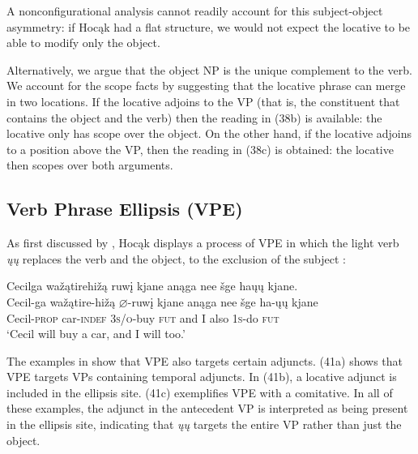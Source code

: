\documentclass[output=paper]{LSP/langsci}
\begin{document}
A nonconfigurational analysis cannot readily account for this subject-object asymmetry: if Hocąk had a flat structure, we would not expect the locative to be able to modify only the object.
	
Alternatively, we argue that the object NP is the unique complement to the verb. We account for the scope facts by suggesting that the locative phrase can merge in two locations. If the locative adjoins to the VP (that is, the constituent that contains the object and the verb) then the reading in (38b) is available: the locative only has scope over the object. On the other hand, if the locative adjoins to a position above the VP, then the reading in (38c) is obtained: the locative then scopes over both arguments.

\subsection{Verb Phrase Ellipsis (VPE)}

As first discussed by \citet{Johnson2013}, Hocąk displays a process of VPE in which the light verb \textit{\k{u}\k{u}} replaces the verb and the object, to the exclusion of the subject :

\begin{exe}
\ex\label{ex:jrs:40} 
\glll Cecilga	wa\v{z}ątirehi\v{z}ą		ruw\k{i}	kjane		anąga	nee		\v{s}ge		ha\k{u}\k{u}			kjane.\\
Cecil-ga	wa\v{z}ątire-hi\v{z}ą	$\varnothing$-ruw\k{i}		kjane		anąga	nee	\v{s}ge ha-\k{u}\k{u}		kjane \\
Cecil-\textsc{prop}		car-\textsc{indef}			\textsc{3s/o}-buy		\textsc{fut}	and	I	also	\textsc{1s}-do	\textsc{fut} \\
\trans `Cecil will buy a car, and I will too.'
\end{exe}

The examples in  show that VPE also targets certain adjuncts. (41a) shows that VPE targets VPs containing temporal adjuncts. In (41b), a locative adjunct is included in the ellipsis site. (41c) exemplifies VPE with a comitative. In all of these examples, the adjunct in the antecedent VP is interpreted as being present in the ellipsis site, indicating that \textit{\k{u}\k{u}} targets the entire VP rather than just the object.
\end{document}
